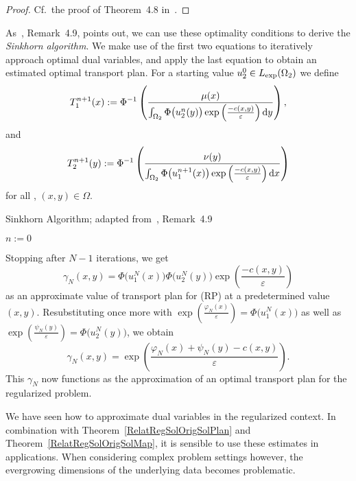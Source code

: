 \begin{proof}
	Cf.~the proof of Theorem~4.8 in~\cite{Cla2021}.
\end{proof}

As~\cite{Cla2021}, Remark~4.9, points out, we can use these optimality conditions to derive the \textit{Sinkhorn algorithm}. We make use of the first two equations to iteratively approach optimal dual variables, and apply the last equation to obtain an estimated optimal transport plan. For a starting value $u_2^0 \in \Lexp[\Omega_2]$ we define
\[ T_1^{n + 1}(x) := \Phi^{-1} \left( \frac{\mu(x)}{\int_{\Omega_2} \Phi\big( u_2^n(y) \big) \exp\left( \frac{-c(x, y)}{\varepsilon} \right)\D[y]} \right), \]
and
\[ T_2^{n + 1}(y) := \Phi^{-1} \left( \frac{\nu(y)}{\int_{\Omega_2} \Phi\big( u_1^{n + 1}(x) \big) \exp\left( \frac{-c(x, y)}{\varepsilon} \right)\D[x]} \right) \]
for all \NinN, $(x, y) \in \Omega$.
\begin{algorithm}\label{SinkhornAlg}
	\caption{Sinkhorn Algorithm; adapted from~\cite{Cla2021}, Remark~4.9}
	$n := 0$\;
\end{algorithm}

Stopping after $N - 1$ iterations, we get
\[ \gamma_N(x, y) = \Phi\big( u_1^N(x) \big) \Phi\big( u_2^N(y) \big) \exp\left( \frac{- c(x, y)}{\varepsilon} \right) \]
as an approximate value of transport plan for (RP) at a predetermined value $(x, y)$. Resubstituting once more with $\exp\left( \frac{\varphi_N(x)}{\varepsilon} \right) = \Phi\big( u_1^N(x) \big)$ as well as $\exp\left( \frac{\psi_N(y)}{\varepsilon} \right) = \Phi\big( u_2^N(y) \big)$, we obtain
\begin{equation}\label{RegApprTransPlan}
	\gamma_N(x, y) = \exp\left( \frac{\varphi_N(x) + \psi_N(y) - c(x, y)}{\varepsilon} \right).
\end{equation}
This $\gamma_N$ now functions as the approximation of an optimal transport plan for the regularized problem.

We have seen how to approximate dual variables in the regularized context. In combination with Theorem~\ref{RelatRegSolOrigSolPlan} and Theorem~\ref{RelatRegSolOrigSolMap}, it is sensible to use these estimates in applications. When considering complex problem settings however, the evergrowing dimensions of the underlying data becomes problematic.

